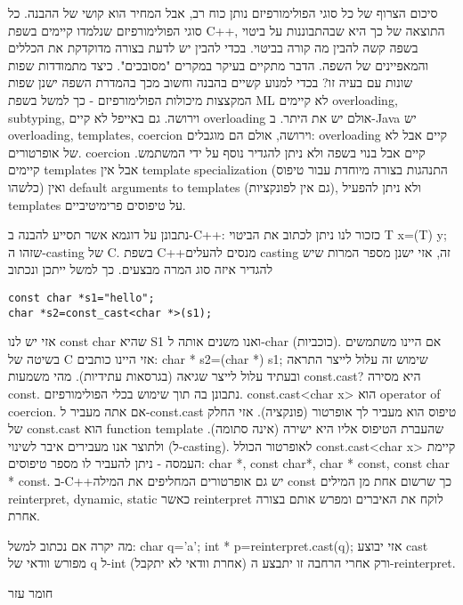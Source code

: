         סיכום
        הצרוף של כל סוגי הפולימורפיזם נותן כוח רב, אבל המחיר הוא קושי של ההבנה. כל סוגי הפולימורפיזם שנלמדו קיימים בשפת C++, התוצאה של כך היא שבהתבוננות על ביטוי בשפה קשה להבין מה קורה בביטוי. בכדי להבין יש לדעת בצורה מדוקדקת את הכללים והמאפיינים של השפה. הדבר מתקיים בעיקר במקרים "מסובכים".
        כיצד מתמודדות שפות שונות עם בעיה זו? בכדי למנוע קשיים בהבנה וחשוב מכך בהמדרת השפה ישנן שפות המקצצות מיכולות הפולימורפיזם - כך למשל בשפת ML לא קיימים overloading, subtyping, וירושה. גם באייפל לא קיים overloading אולם יש את היתר.
        ב-Java יש overloading, templates, coercion וירושה, אולם הם מוגבלים:
        overloading קיים אבל לא של אופרטורים.
        coercion קיים אבל בנוי בשפה ולא ניתן להגדיר נוסף על ידי המשתמש.
        קיימים templates אבל אין template specialization (התנהגות בצורה מיוחדת עבור טיפוס כלשהו) ואין default arguments to templates (גם אין לפונקציות), ולא ניתן להפעיל templates על טיפוסים פרימיטיביים.

        נתבונן על דוגמא אשר תסייע להבנה ב-C++:
        כזכור לנו ניתן לכתוב את הביטוי T x=(T) y; שזהו ה-casting של C. בשפת C++מנסים להעלים casting זה, אזי ישנן מספר המרות שיש להגדיר איזה סוג המרה מבצעים. כך למשל ייתכן ונכתוב

\begin{verbatim}
const char *s1="hello";
char *s2=const_cast<char *>(s1);
\end{verbatim}

        אזי יש לנו const char שהיא S1 ואנו משנים אותה ל-char (כוכביות). אם היינו משתמשים בשיטה של C אזי היינו כותבים:
        char * s2=(char *) s1;
        שימוש זה עלול לייצר התראה ובעתיד עלול לייצר שגיאה (בגרסאות עתידיות).
        מהי משמעות const.cast? היא מסירה const. נתבונן בה תוך שימוש בכלי הפולימורפיזם.
        const.cast<char x> הוא operator of coercion. אם אתה מעביר ל-const.cast טיפוס הוא מעביר לך אופרטור (פונקציה). אזי החלק של const.cast הוא function template שהעברת הטיפוס אליו היא ישירה (אינה סתומה). ולתוצר אנו מעבירים איבר לשינוי (ל-casting). לאופרטור הכולל const.cast<char x> קיימת העמסה - ניתן להעביר לו מספר טיפוסים: char *, const char*, char * const, const char * const.
        ב-C++יש גם אופרטורים המחליפים את המילה const כך שרשום אחת מן המילים reinterpret, dynamic, static כאשר reinterpret לוקח את האיברים ומפרש אותם בצורה אחרת.

        מה יקרה אם נכתוב למשל:
        char q='a';
        int * p=reinterpret.cast(q);
        אזי יבוצע cast מפורש וודאי של q ל-int (אחרת וודאי לא יתקבל) ורק אחרי הרחבה זו יתבצע ה-reinterpret.

        חומר עזר

